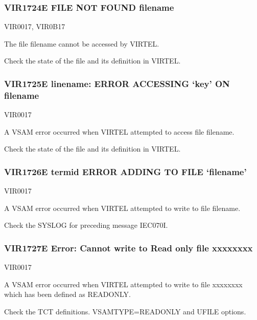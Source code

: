 \documentclass[letterpaper,10pt,english]{sphinxmanual}
\begin{document}
\subsubsection{VIR1724E FILE NOT FOUND filename}
\label{\detokenize{messages:vir1724e-file-not-found-filename}}\begin{description}
\sphinxAtStartPar
VIR0017, VIR0B17

\sphinxAtStartPar
The file filename cannot be accessed by VIRTEL.

\sphinxAtStartPar
Check the state of the file and its definition in VIRTEL.

\end{description}


\subsubsection{VIR1725E linename: ERROR ACCESSING ‘key’ ON filename}
\label{\detokenize{messages:vir1725e-linename-error-accessing-key-on-filename}}\begin{description}
\sphinxAtStartPar
VIR0017

\sphinxAtStartPar
A VSAM error occurred when VIRTEL attempted to access file filename.

\sphinxAtStartPar
Check the state of the file and its definition in VIRTEL.

\end{description}


\subsubsection{VIR1726E termid ERROR ADDING TO FILE ‘filename’}
\label{\detokenize{messages:vir1726e-termid-error-adding-to-file-filename}}\begin{description}
\sphinxAtStartPar
VIR0017

\sphinxAtStartPar
A VSAM error occurred when VIRTEL attempted to write to file filename.

\sphinxAtStartPar
Check the SYSLOG for preceding message IEC070I.

\end{description}


\subsubsection{VIR1727E Error: Cannot write to Read only file xxxxxxxx}
\label{\detokenize{messages:vir1727e-error-cannot-write-to-read-only-file-xxxxxxxx}}\begin{description}
\sphinxAtStartPar
VIR0017

\sphinxAtStartPar
A VSAM error occurred when VIRTEL attempted to write to file xxxxxxxx which has been defined as READONLY.

\sphinxAtStartPar
Check the TCT definitions. VSAMTYPE=READONLY and UFILE options.

\end{description}
\end{document}

